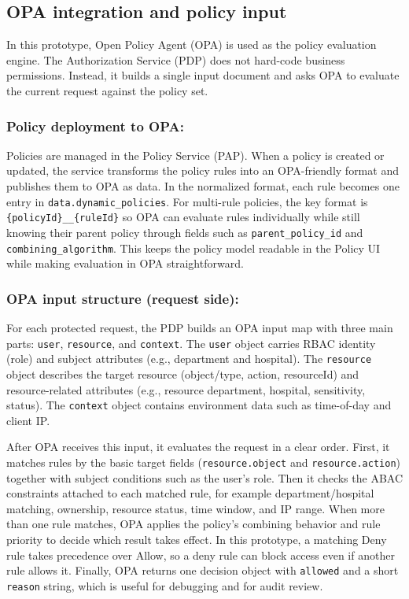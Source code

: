 \subsection{OPA integration and policy input}
\label{sec:opa-integration}

In this prototype, Open Policy Agent (OPA) is used as the policy evaluation engine. The Authorization
Service (PDP) does not hard-code business permissions. Instead, it builds a single input document and
asks OPA to evaluate the current request against the policy set.

\subsubsection{Policy deployment to OPA:}
Policies are managed in the Policy Service (PAP). When a policy is created or updated, the service
transforms the policy rules into an OPA-friendly format and publishes them to OPA as data. In the
normalized format, each rule becomes one entry in \texttt{data.dynamic\_policies}. For multi-rule
policies, the key format is \texttt{\{policyId\}\_\_\{ruleId\}} so OPA can evaluate rules individually
while still knowing their parent policy through fields such as \texttt{parent\_policy\_id} and
\texttt{combining\_algorithm}. This keeps the policy model readable in the Policy UI while making
evaluation in OPA straightforward.

\subsubsection{OPA input structure (request side):}
For each protected request, the PDP builds an OPA input map with three main parts:
\texttt{user}, \texttt{resource}, and \texttt{context}. The \texttt{user} object carries RBAC identity
(role) and subject attributes (e.g., department and hospital). The \texttt{resource} object describes
the target resource (object/type, action, resourceId) and resource-related attributes (e.g., resource
department, hospital, sensitivity, status). The \texttt{context} object contains environment data such as
time-of-day and client IP.
\vspace{0.5cm}


After OPA receives this input, it evaluates the request in a clear order. First, it matches rules by the basic target
fields (\texttt{resource.object} and \texttt{resource.action}) together with subject conditions such as the user's role.
Then it checks the ABAC constraints attached to each matched rule, for example department/hospital matching, ownership,
resource status, time window, and IP range. When more than one rule matches, OPA applies the policy’s combining behavior
and rule priority to decide which result takes effect. In this prototype, a matching Deny rule takes precedence over Allow,
so a deny rule can block access even if another rule allows it. Finally, OPA returns one decision object with
\texttt{allowed} and a short \texttt{reason} string, which is useful for debugging and for audit review.
\vspace{0.5cm}

